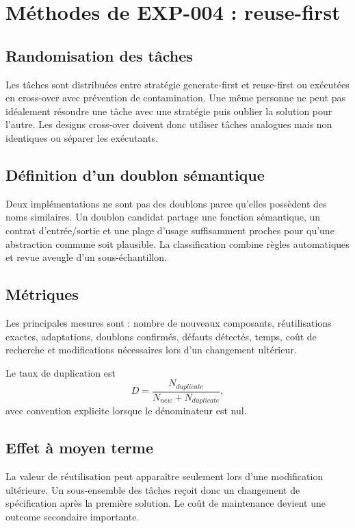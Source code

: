 \chapter{Méthodes de EXP-004 : reuse-first}

\section{Randomisation des tâches}

Les tâches sont distribuées entre stratégie generate-first et reuse-first ou exécutées en cross-over avec prévention de contamination. Une même personne ne peut pas idéalement résoudre une tâche avec une stratégie puis oublier la solution pour l'autre. Les designs cross-over doivent donc utiliser tâches analogues mais non identiques ou séparer les exécutants.

\section{Définition d'un doublon sémantique}

Deux implémentations ne sont pas des doublons parce qu'elles possèdent des noms similaires. Un doublon candidat partage une fonction sémantique, un contrat d'entrée/sortie et une plage d'usage suffisamment proches pour qu'une abstraction commune soit plausible. La classification combine règles automatiques et revue aveugle d'un sous-échantillon.

\section{Métriques}

Les principales mesures sont : nombre de nouveaux composants, réutilisations exactes, adaptations, doublons confirmés, défauts détectés, temps, coût de recherche et modifications nécessaires lors d'un changement ultérieur.

Le taux de duplication est
\[
D=\frac{N_{duplicate}}{N_{new}+N_{duplicate}},
\]
avec convention explicite lorsque le dénominateur est nul.

\section{Effet à moyen terme}

La valeur de réutilisation peut apparaître seulement lors d'une modification ultérieure. Un sous-ensemble des tâches reçoit donc un changement de spécification après la première solution. Le coût de maintenance devient une outcome secondaire importante.

